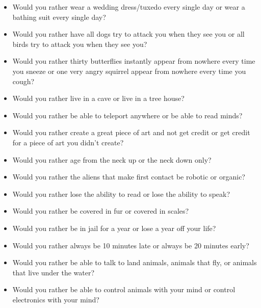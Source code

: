 \documentclass[../../../main.tex]{subfiles}
\begin{document}
\begin{itemize}
    \item Would you rather wear a wedding dress/tuxedo every single day or wear a bathing suit every single day?
    \item Would you rather have all dogs try to attack you when they see you or all birds try to attack you when they see you?
    \item Would you rather thirty butterflies instantly appear from nowhere every time you sneeze or one very angry squirrel appear from nowhere every time you cough?
    \item Would you rather live in a cave or live in a tree house?
    \item Would you rather be able to teleport anywhere or be able to read minds?
    \item Would you rather create a great piece of art and not get credit or get credit for a piece of art you didn’t create?
    \item Would you rather age from the neck up or the neck down only?
    \item Would you rather the aliens that make first contact be robotic or organic?
    \item Would you rather lose the ability to read or lose the ability to speak?
    \item Would you rather be covered in fur or covered in scales?
    \item Would you rather be in jail for a year or lose a year off your life?
    \item Would you rather always be 10 minutes late or always be 20 minutes early?
    \item Would you rather be able to talk to land animals, animals that fly, or animals that live under the water?
    \item Would you rather be able to control animals with your mind or control electronics with your mind?
\end{itemize}
\end{document}
